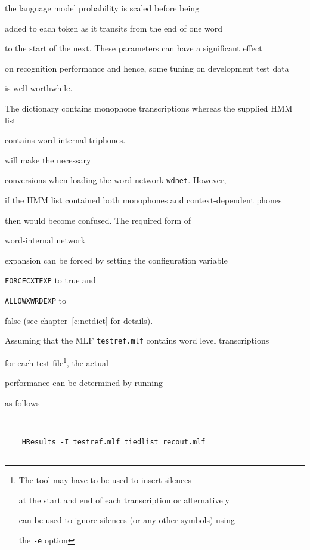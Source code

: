 the language model probability is scaled before being 


added to each token  as it transits from the end of one word


to the start of the next.  These parameters can have a significant effect


on recognition performance and hence, some tuning on development test data


is well worthwhile.





The dictionary contains monophone transcriptions whereas the supplied HMM list


contains word internal triphones.   


will make the necessary 


conversions when loading the word network \texttt{wdnet}.  However, 


if the HMM list contained both monophones and context-dependent phones


then  would become confused.  The required form of 


word-internal network 


expansion can be forced by setting the configuration variable


\texttt{FORCECXTEXP} to true and 


\texttt{ALLOWXWRDEXP} to 


false (see chapter~\ref{c:netdict} for details).





Assuming that the MLF \texttt{testref.mlf} contains word level transcriptions


for each test file\footnote{The  tool may have to be used to insert silences 


at the start and end of each transcription or alternatively


 can be used to ignore silences (or any other symbols) using


the \texttt{-e} option}, the actual


performance can be determined by running 


 as follows


\begin{verbatim}


    HResults -I testref.mlf tiedlist recout.mlf


\end{verbatim}


